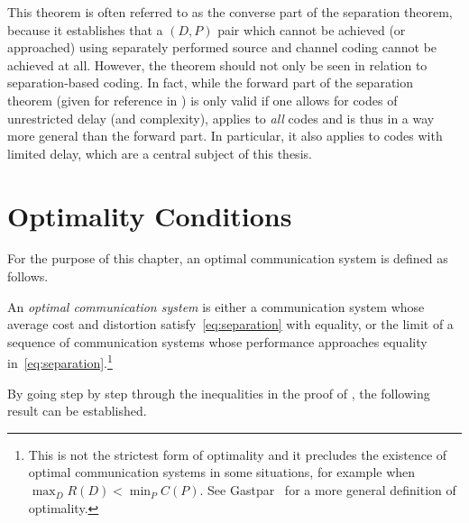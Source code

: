 This theorem is often referred to as the converse part of the separation
theorem, because it establishes that a $(D,P)$ pair which cannot be achieved (or
approached) using separately performed source and channel coding cannot be
achieved at all. However, the theorem should not only be seen in relation to
separation-based coding.  In fact, while the forward part of the
separation theorem (given for reference in ) is only
valid if one allows for codes of unrestricted delay (and complexity),
 applies to \emph{all} codes and is thus in a way
more general than the forward part. In particular, it also applies to codes with
limited delay, which are a central subject of this thesis.


\section{Optimality Conditions}\label{sec:optimality}

For the purpose of this chapter, an optimal communication system is
defined as follows.

\begin{definition}
  \label{def:optimality}
  An \emph{optimal communication system} is either a communication system whose
  average cost and distortion satisfy~\eqref{eq:separation} with equality, or
  the limit of a sequence of communication systems whose performance approaches
  equality in~\eqref{eq:separation}.\footnote{This is not the strictest form of
  optimality and it precludes the existence of optimal communication systems in
  some situations, for example when $\max_D R(D) < \min_P C(P)$. See
  Gastpar~\cite{GastparThesis} for a more general  definition of optimality.}
\end{definition}

By going step by step through the inequalities in the proof of
, the following result can be established. 

